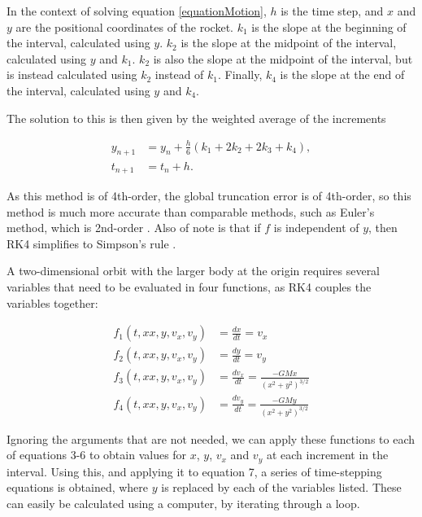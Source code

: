 \documentclass[twocolumn,prl,nobalancelastpage,aps,10pt]{revtex4-1}
\begin{document}
In the context of solving equation \ref{equationMotion}, $h$ is the time step, and $x$ and $y$ are the positional coordinates of the rocket. $k_{1}$ is the slope at the beginning of the interval, calculated using $y$. $k_{2}$ is the slope at the midpoint of the interval, calculated using $y$ and $k_{1}$. $k_{2}$ is also the slope at the midpoint of the interval, but is instead calculated using $k_{2}$ instead of $k_{1}$. Finally, $k_{4}$ is the slope at the end of the interval, calculated using $y$ and $k_{4}$.

The solution to this is then given by the weighted average of the increments \cite{Press2007}

\begin{align}
y_{n+1}& = y_{n} + \frac{h}{6}(k_{1} + 2k_{2} + 2k_{3} + k_{4}) , \\
t_{n+1}& = t_{n} + h .
\end{align}\label{rungeEquation}

As this method is of 4th-order, the global truncation error is of  4th-order, so this method is much more accurate than comparable methods, such as Euler's method, which is 2nd-order \cite{Atkinson1989, Suli2003}. Also of note is that if $f$ is independent of $y$, then RK4 simplifies to Simpson's rule \cite{Suli2003}.


A two-dimensional orbit with the larger body at the origin requires several variables that need to be evaluated in four functions, as RK4 couples the variables together:

\begin{align}
f_{1}(t, xx, y, v_{x}, v_{y})& = \frac{dx}{dt} = v_{x}\\
f_{2}(t, xx, y, v_{x}, v_{y})& = \frac{dy}{dt} = v_{y}\\
f_{3}(t, xx, y, v_{x}, v_{y})& = \frac{dv_{x}}{dt} = \frac{-GMx}{(x^{2} + y^{2})^{3/2}}\\
f_{4}(t, xx, y, v_{x}, v_{y})& = \frac{dv_{y}}{dt} = \frac{-GMy}{(x^{2} + y^{2})^{3/2}}
\end{align}

Ignoring the arguments that are not needed, we can apply these functions to each of equations 3-6 to obtain values for $x$, $y$, $v_{x}$ and $v_{y}$ at each increment in the interval. Using this, and applying it to equation 7, a series of time-stepping equations is obtained, where $y$ is replaced by each of the variables listed. These can easily be calculated using a computer, by iterating through a loop.
\end{document}
